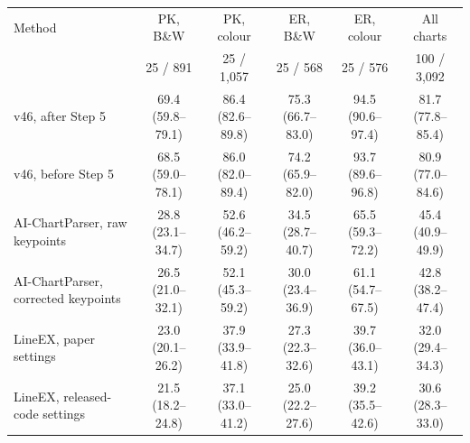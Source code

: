 \begin{tabular}{lccccc}
\toprule
Method & PK, B\&W & PK, colour & ER, B\&W & ER, colour & All charts \\
 & 25 / 891 & 25 / 1,057 & 25 / 568 & 25 / 576 & 100 / 3,092 \\
\midrule
v46, after Step 5 & 69.4 (59.8--79.1) & 86.4 (82.6--89.8) & 75.3 (66.7--83.0) & 94.5 (90.6--97.4) & 81.7 (77.8--85.4) \\
v46, before Step 5 & 68.5 (59.0--78.1) & 86.0 (82.0--89.4) & 74.2 (65.9--82.0) & 93.7 (89.6--96.8) & 80.9 (77.0--84.6) \\
AI-ChartParser, raw keypoints & 28.8 (23.1--34.7) & 52.6 (46.2--59.2) & 34.5 (28.7--40.7) & 65.5 (59.3--72.2) & 45.4 (40.9--49.9) \\
AI-ChartParser, corrected keypoints & 26.5 (21.0--32.1) & 52.1 (45.3--59.2) & 30.0 (23.4--36.9) & 61.1 (54.7--67.5) & 42.8 (38.2--47.4) \\
LineEX, paper settings & 23.0 (20.1--26.2) & 37.9 (33.9--41.8) & 27.3 (22.3--32.6) & 39.7 (36.0--43.1) & 32.0 (29.4--34.3) \\
LineEX, released-code settings & 21.5 (18.2--24.8) & 37.1 (33.0--41.2) & 25.0 (22.2--27.6) & 39.2 (35.5--42.6) & 30.6 (28.3--33.0) \\
\bottomrule
\end{tabular}
